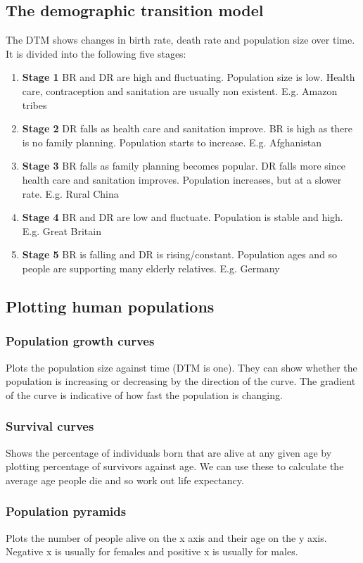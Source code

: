 \documentclass{article}
\begin{document}
\subsection*{The demographic transition model}
The DTM shows changes in birth rate, death rate and population size over time. It is divided into the following five stages:
\begin{enumerate}
	\item[] \textbf{Stage 1} BR and DR are high and fluctuating. Population size is low. Health care, contraception and sanitation are usually non existent. E.g. Amazon tribes
	\item[] \textbf{Stage 2} DR falls as health care and sanitation improve. BR is high as there is no family planning. Population starts to increase. E.g. Afghanistan
	\item[] \textbf{Stage 3} BR falls as family planning becomes popular. DR falls more since health care and sanitation improves. Population increases, but at a slower rate. E.g. Rural China
	\item[] \textbf{Stage 4} BR and DR are low and fluctuate. Population is stable and high. E.g. Great Britain
	\item[] \textbf{Stage 5} BR is falling and DR is rising/constant. Population ages and so people are supporting many elderly relatives. E.g. Germany
\end{enumerate}

\subsection*{Plotting human populations}
\subsubsection*{Population growth curves}
Plots the population size against time (DTM is one). They can show whether the population is increasing or decreasing by the direction of the curve. The gradient of the curve is indicative of how fast the population is changing.

\subsubsection*{Survival curves}
Shows the percentage of individuals born that are alive at any given age by plotting percentage of survivors against age. We can use these to calculate the average age people die and so work out life expectancy.

\subsubsection*{Population pyramids}
Plots the number of people alive on the x axis and their age on the y axis. Negative x is usually for females and positive x is usually for males.
\end{document}
